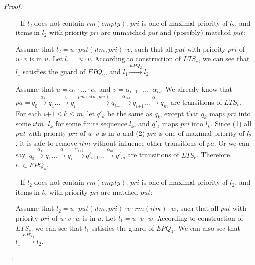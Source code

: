 \begin {proof}
\begin{itemize}
\item[-] If $l_2$ does not contain $\textit{rm}(\textit{empty})$, $\textit{pri}$ is one of maximal priority of $l_2$, and items in $l_2$ with priority $\textit{pri}$ are unmatched $\textit{put}$ and (possibly) matched $\textit{put}$:

    Assume that $l_2 = u \cdot \textit{put}(\textit{itm},\textit{pri}) \cdot v$, such that all $\textit{put}$ with priority $\textit{pri}$ of $u \cdot v$ is in $u$. Let $l_1 = u \cdot v$. According to construction of $\textit{LTS}_e$, we can see that $l_1$ satisfies the guard of $\textit{EPQ}_2$, and $l_1 \xrightarrow{\textit{EPQ}_2} l_2$.

    Assume that $u = \alpha_1 \cdot \ldots \cdot \alpha_i$ and $v = \alpha_{\textit{i+1}} \cdot \ldots \cdot \alpha_m$. We already know that $\textit{pa} = q_0 \xrightarrow{\alpha_1} q_1 \ldots \xrightarrow{\alpha_i} q_i \xrightarrow{\textit{put}(\textit{itm},\textit{pri})} q_{\textit{i+}} \xrightarrow{\alpha_{\textit{i+1}}} q_{\textit{i+1}} \ldots \xrightarrow{\alpha_m} q_m$ are transitions of $\textit{LTS}_e$. For each $\textit{i+1} \leq k \leq m$, let $q'_k$ be the same as $q_k$, except that $q_k$ maps $\textit{pri}$ into some $\textit{itm} \cdot l_k$ for some finite sequence $l_k$, and $q'_k$ maps $\textit{pri}$ into $l_k$. Since (1) all $\textit{put}$ with priority $\textit{pri}$ of $u \cdot v$ is in $u$ and (2) $\textit{pri}$ is one of maximal priority of $l_2$, it is safe to remove $\textit{itm}$ without influence other transitions of $\textit{pa}$. Or we can say, $q_0 \xrightarrow{\alpha_1} q_1 \ldots \xrightarrow{\alpha_i} q_i \xrightarrow{\alpha_{\textit{i+1}}} q'_{\textit{i+1}} \ldots \xrightarrow{\alpha_m} q'_m$ are transitions of $\textit{LTS}_e$. Therefore, $l_1 \in \textit{EPQ}_s$.


\item[-] If $l_2$ does not contain $\textit{rm}(\textit{empty})$, $\textit{pri}$ is one of maximal priority of $l_2$, and items in $l_2$ with priority $\textit{pri}$ are matched $\textit{put}$:

    Assume that $l_2 = u \cdot \textit{put}(\textit{itm},\textit{pri}) \cdot v \cdot \textit{rm}(\textit{itm}) \cdot w$, such that all $\textit{put}$ with priority $\textit{pri}$ of $u \cdot v \cdot w$ is in $u$. Let $l_1 = u \cdot v \cdot w$. According to construction of $\textit{LTS}_e$, we can see that $l_1$ satisfies the guard of $\textit{EPQ}_1$. We can also see that $l_1 \xrightarrow{\textit{EPQ}_1} l_2$.


\end{itemize}
\end{proof}
